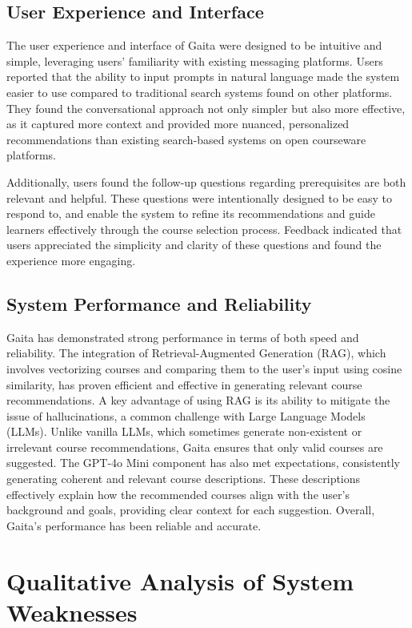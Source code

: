\subsection{User Experience and Interface}

The user experience and interface of Gaita were designed to be intuitive and simple, leveraging users' familiarity with existing messaging platforms. Users reported that the ability to input prompts in natural language made the system easier to use compared to traditional search systems found on other platforms. They found the conversational approach not only simpler but also more effective, as it captured more context and provided more nuanced, personalized recommendations than existing search-based systems on open courseware platforms.

Additionally, users found the follow-up questions regarding prerequisites are both relevant and helpful. These questions were intentionally designed to be easy to respond to, and enable the system to refine its recommendations and guide learners effectively through the course selection process. Feedback indicated that users appreciated the simplicity and clarity of these questions and found the experience more engaging. 

\subsection{System Performance and Reliability}

Gaita has demonstrated strong performance in terms of both speed and reliability. The integration of Retrieval-Augmented Generation (RAG), which involves vectorizing courses and comparing them to the user’s input using cosine similarity, has proven efficient and effective in generating relevant course recommendations. A key advantage of using RAG is its ability to mitigate the issue of hallucinations, a common challenge with Large Language Models (LLMs). Unlike vanilla LLMs, which sometimes generate non-existent or irrelevant course recommendations, Gaita ensures that only valid courses are suggested. The GPT-4o Mini component has also met expectations, consistently generating coherent and relevant course descriptions. These descriptions effectively explain how the recommended courses align with the user’s background and goals, providing clear context for each suggestion. Overall, Gaita's performance has been reliable and accurate.

\section{Qualitative Analysis of System Weaknesses}

